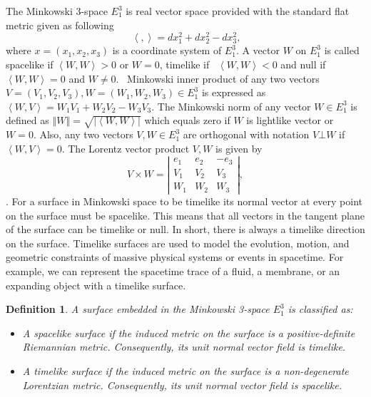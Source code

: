 \documentclass[reqno]{amsart}
\theoremstyle{plain}
\newtheorem{definition}{Definition}
\numberwithin{equation}{section}
\begin{document}
The Minkowski 3-space $E_{1}^{3}$ is real vector space provided with the
standard flat metric given as following 
\begin{equation}
\ \left\langle ,\right\rangle =dx_{1}^{2}+dx_{2}^{2}-dx_{3}^{2},  \tag{2.1}
\end{equation}%
where $x=(x_{1},x_{2},x_{3})$ is a coordinate system of $E_{1}^{3}$. A
vector $W$ on $E_{1}^{3}$ is called spacelike if $\left\langle
W,W\right\rangle >0$ or $W=0$, timelike if \ $\left\langle W,W\right\rangle
<0$ and null if \ $\left\langle W,W\right\rangle =0$ and $W\neq 0$. \
Minkowski inner product of any two vectors $%
V=(V_{1},V_{2},V_{3}),W=(W_{1},W_{2},W_{3})\in E_{1}^{3}$ is expressed as $%
\left\langle W,V\right\rangle =W_{1}V_{1}+W_{2}V_{2}-W_{3}V_{3}$. The
Minkowski norm of any vector $W\in E_{1}^{3}$ is defined as $\left\Vert
W\right\Vert =\sqrt{\left\vert \left\langle W,W\right\rangle \right\vert }$
which equals zero if $W$ is lightlike vector or $W=0.$ Also, any two vectors 
$V,W\in E_{1}^{3}$ are orthogonal with notation $V\bot W$ if $\left\langle
W,V\right\rangle =0.$ The Lorentz vector product $V,W$ is given by%
\begin{equation}
V\times W=\left\vert 
\begin{array}{ccc}
e_{1} & e_{2} & -e_{3} \\ 
V_{1} & V_{2} & V_{3} \\ 
W_{1} & W_{2} & W_{3}%
\end{array}%
\right\vert ,  \tag{2.2}
\end{equation}%
\cite{2,7}. For a surface in Minkowski space to be timelike its normal
vector at every point on the surface must be spacelike. This means that all
vectors in the tangent plane of the surface can be timelike or null. In
short, there is always a timelike direction on the surface. Timelike
surfaces are used to model the evolution, motion, and geometric constraints
of massive physical systems or events in spacetime. For example, we can
represent the spacetime trace of a fluid, a membrane, or an expanding object
with a timelike surface.

\begin{definition} \cite{13}
A surface embedded in the Minkowski 3-space $E_{1}^{3}$ is classified as:
\begin{itemize}
    \item A spacelike surface if the induced metric on the surface is a positive-definite Riemannian metric. Consequently, its unit normal vector field is timelike.
    \item A timelike surface if the induced metric on the surface is a non-degenerate Lorentzian metric. Consequently, its unit normal vector field is spacelike.
\end{itemize}
\end{definition}
\end{document}
